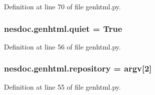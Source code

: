 Definition at line 70 of file genhtml.\+py.

\subsubsection[{\texorpdfstring{quiet}{quiet}}]{ nesdoc.\+genhtml.\+quiet = True}\hypertarget{namespacenesdoc_1_1genhtml_a00f7bb8cfab54c7b66671b161586e291}{}\label{namespacenesdoc_1_1genhtml_a00f7bb8cfab54c7b66671b161586e291}


Definition at line 56 of file genhtml.\+py.

\subsubsection[{\texorpdfstring{repository}{repository}}]{\setlength{\rightskip}{0pt plus 5cm}nesdoc.\+genhtml.\+repository = argv\mbox{[}2\mbox{]}}\hypertarget{namespacenesdoc_1_1genhtml_ac786cf6372662e1e1d4a412db5e29a05}{}\label{namespacenesdoc_1_1genhtml_ac786cf6372662e1e1d4a412db5e29a05}


Definition at line 55 of file genhtml.\+py.

